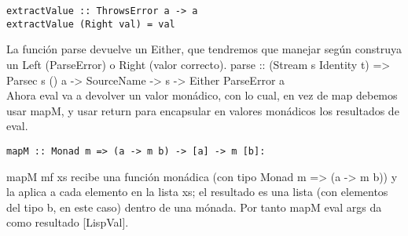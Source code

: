 \begin{minipage}{\linewidth}
\begin{small}
\begin{lstlisting}[frame=single]
extractValue :: ThrowsError a -> a
extractValue (Right val) = val
\end{lstlisting}
\end{small}
\end{minipage}

La funci\'on parse devuelve un Either, que tendremos que manejar seg\'un construya un Left (ParseError) o Right (valor correcto). parse :: (Stream s Identity t) => Parsec s () a -> SourceName -> s -> Either ParseError a\\

Ahora eval va a devolver un valor mon\'adico, con lo cual, en vez de map debemos usar mapM, y usar return para encapsular en valores mon\'adicos los resultados de eval.\\

\begin{minipage}{\linewidth}
\begin{small}
\begin{lstlisting}[frame=single]
mapM :: Monad m => (a -> m b) -> [a] -> m [b]:
\end{lstlisting}
\end{small}
\end{minipage}

mapM mf xs recibe una funci\'on mon\'adica (con tipo Monad m => (a -> m b)) y la aplica a cada elemento en la lista xs; el resultado es una lista (con elementos del tipo b, en este caso) dentro de una m\'onada. Por tanto mapM eval args da como resultado [LispVal].\\

